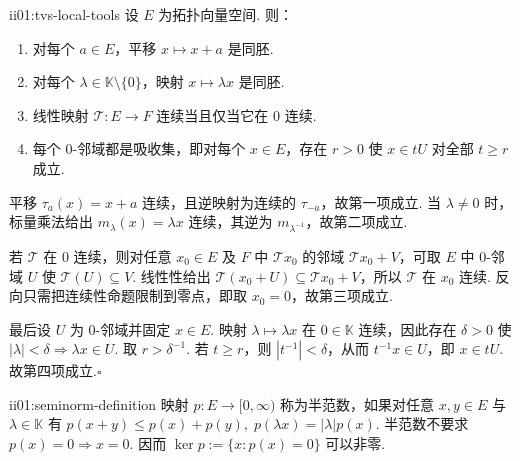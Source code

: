 \begin{FAProposition}[C][拓扑向量空间的局部工具]{ii01:tvs-local-tools}
设 \(\displaystyle E\) 为拓扑向量空间. 则：
\begin{enumerate}[label=(\roman*)]
\item 对每个 \(\displaystyle a\in E\)，平移 \(\displaystyle x\mapsto x+a\) 是同胚.
\item 对每个 \(\displaystyle \lambda\in\mathbb K\setminus\{0\}\)，映射 \(\displaystyle x\mapsto\lambda x\) 是同胚.
\item 线性映射 \(\displaystyle \mathcal T:E\to F\) 连续当且仅当它在 \(\displaystyle0\) 连续.
\item 每个 \(\displaystyle0\)-邻域都是吸收集，即对每个 \(\displaystyle x\in E\)，存在 \(\displaystyle r>0\) 使 \(\displaystyle x\in tU\) 对全部 \(\displaystyle t\geqslant r\) 成立.
\end{enumerate}
\end{FAProposition}

\begin{FAProof}
平移 \(\displaystyle \tau_a(x)=x+a\) 连续，且逆映射为连续的 \(\displaystyle \tau_{-a}\)，故第一项成立. 当 \(\displaystyle \lambda\neq0\) 时，标量乘法给出 \(\displaystyle m_\lambda(x)=\lambda x\) 连续，其逆为 \(\displaystyle m_{\lambda^{-1}}\)，故第二项成立.

若 \(\displaystyle \mathcal T\) 在 \(\displaystyle0\) 连续，则对任意 \(\displaystyle x_0\in E\) 及 \(\displaystyle F\) 中 \(\displaystyle \mathcal Tx_0\) 的邻域 \(\displaystyle \mathcal Tx_0+V\)，可取 \(\displaystyle E\) 中 \(\displaystyle0\)-邻域 \(\displaystyle U\) 使 \(\displaystyle \mathcal T(U)\subseteq V\). 线性性给出 \(\displaystyle \mathcal T(x_0+U)\subseteq\mathcal Tx_0+V\)，所以 \(\displaystyle \mathcal T\) 在 \(\displaystyle x_0\) 连续. 反向只需把连续性命题限制到零点，即取 \(\displaystyle x_0=0\)，故第三项成立.

最后设 \(\displaystyle U\) 为 \(\displaystyle0\)-邻域并固定 \(\displaystyle x\in E\). 映射 \(\displaystyle \lambda\mapsto\lambda x\) 在 \(\displaystyle0\in\mathbb K\) 连续，因此存在 \(\displaystyle \delta>0\) 使 \(\displaystyle |\lambda|<\delta\Rightarrow\lambda x\in U\). 取 \(\displaystyle r>\delta^{-1}\). 若 \(\displaystyle t\geqslant r\)，则 \(\displaystyle |t^{-1}|<\delta\)，从而 \(\displaystyle t^{-1}x\in U\)，即 \(\displaystyle x\in tU\). 故第四项成立.\hfill\(\square\)
\end{FAProof}

\begin{FADefinition}[C][半范数]{ii01:seminorm-definition}
映射 \(\displaystyle p:E\to[0,\infty)\) 称为半范数，如果对任意 \(\displaystyle x,y\in E\) 与 \(\displaystyle \lambda\in\mathbb K\) 有
\(\displaystyle p(x+y)\leqslant p(x)+p(y), \; p(\lambda x)=|\lambda|p(x).\)
半范数不要求 \(\displaystyle p(x)=0\Rightarrow x=0\). 因而 \(\displaystyle \ker p:=\{x:p(x)=0\}\) 可以非零.
\end{FADefinition}

